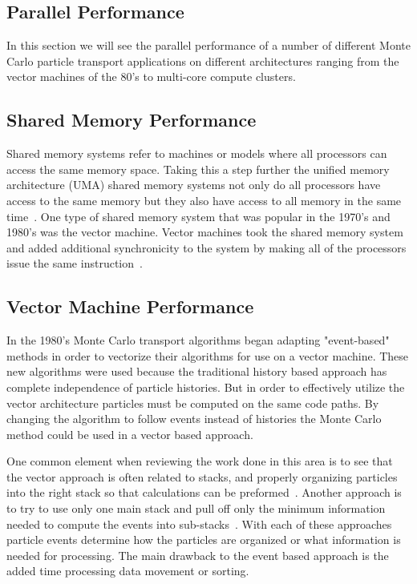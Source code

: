 \subsection{Parallel Performance}

In this section we will see the parallel performance of a number of different Monte Carlo particle transport applications on different architectures ranging from the vector machines of the 80's to multi-core compute clusters.
%

\subsection*{ \textbf{Shared Memory Performance}} 

Shared memory systems refer to machines or models where all processors can access the same memory space.
%
Taking this a step further the unified memory architecture (UMA) shared memory systems not only do all processors have access to the same memory but they also have access to all memory in  the same time~\cite{el2005advanced}.
%
One type of shared memory system that was popular in the 1970's and 1980's was the vector machine.
%
Vector machines took the shared memory system and added additional synchronicity to the system by making all of the processors issue the same instruction~\cite{russell1978cray}.
%

\subsection*{Vector Machine Performance}

%
In the 1980's Monte Carlo transport algorithms began adapting "event-based" methods in order to vectorize their algorithms for use on a vector machine.
%
These new algorithms were used because the traditional history based approach has complete independence of particle histories.
%
But in order to effectively utilize the vector architecture particles must be computed on the same code paths.
%
By changing the algorithm to follow events instead of histories the Monte Carlo method could be used in a vector based approach. ~\cite{martin1986monte}
%

%
One common element when reviewing the work done in this area is to see that the vector approach is often related to stacks, and properly organizing particles into the right stack so that calculations can be preformed~\cite{brown1984monte, bobrowicz1984vectorized}.
%
Another approach is to try to use only one main stack and pull off only the minimum information needed to compute the events into sub-stacks~\cite{martin1986monte}.
%
With each of these approaches particle events determine how the particles are organized or what information is needed for processing.
%
The main drawback to the event based approach is the added time processing data movement or sorting.
%

